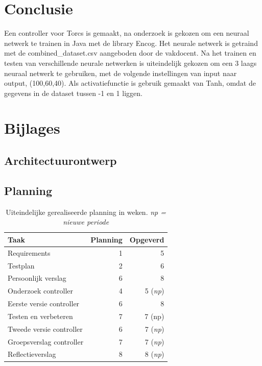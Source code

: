 \documentclass{article}
\begin{document}
\section{Conclusie}
Een controller voor Torcs is gemaakt, na onderzoek is gekozen om een neuraal netwerk te trainen in Java met de library Encog. Het neurale netwerk is getraind met de combined\_dataset.csv aangeboden door de vakdocent. Na het trainen en testen van verschillende neurale netwerken is uiteindelijk gekozen om een 3 laags neuraal netwerk te gebruiken, met de volgende instellingen van input naar output, (100,60,40). Als activatiefunctie is gebruik gemaakt van Tanh, omdat de gegevens in de dataset tussen -1 en 1 liggen.
\pagebreak
\section{Bijlages}
\subsection{Architectuurontwerp}

\pagebreak


\pagebreak
\subsection{Planning}
\label{uiteind-plan}
\begin{table}[h!]
\begin{tabular}{lrr}
 \textbf{Taak} & \textbf{Planning} & \textbf{Opgeverd} \\ \hline
 Requirements & 1 & 5 \\
 Testplan & 2 & 6 \\
 Persoonlijk verslag & 6 & 8 \\
 Onderzoek controller & 4 & 5 (\textit{np}) \\
 Eerste versie controller & 6 & 8 \\
 Testen en verbeteren & 7 & 7 (np) \\
 Tweede versie controller & 6 & 7 (\textit{np}) \\
 Groepsverslag controller & 7 & 7 (\textit{np}) \\
 Reflectieverslag & 8 & 8 (\textit{np})  \\
\end{tabular}
\caption{Uiteindelijke gerealiseerde planning in weken. \textit{np = nieuwe periode}}
\end{table}
\newpage
\end{document}
